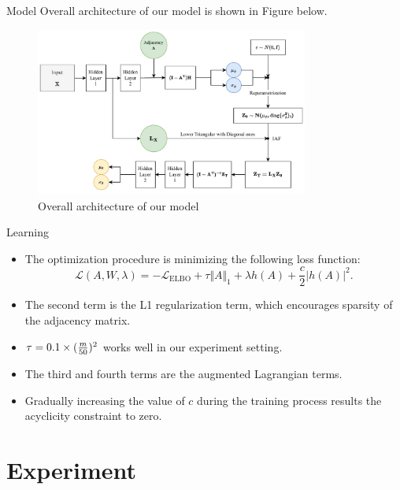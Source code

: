 \documentclass{beamer}
\begin{document}
\begin{frame}{Model}
    Overall architecture of our model is shown in Figure below.
    \begin{figure}
        \centering
        \includegraphics[width=0.8\textwidth]{fig/model.pdf}
        \caption{Overall architecture of our model}
        \label{fig:architecture}
    \end{figure}
\end{frame}

\begin{frame}{Learning}
    \begin{itemize}
        \item The optimization procedure is minimizing the following loss function:
        \begin{equation*}
            \mathcal{L}(A, W, \lambda) =-\mathcal{L}_{\mathrm{ELBO}} + \tau \Vert A \Vert_1 + \lambda h(A) + \frac{c}{2} |h(A)|^2.
        \end{equation*}
        \item The second term is the L1 regularization term, which encourages sparsity of the adjacency matrix.
        \item $\tau=0.1 \times ({m\over 50})^2$ works well in our experiment setting.
        \item The third and fourth terms are the augmented Lagrangian terms.
        \item Gradually increasing the value of $c$ during the training process results the acyclicity constraint to zero.
    \end{itemize}
\end{frame}
            

\section{Experiment}
\end{document}
